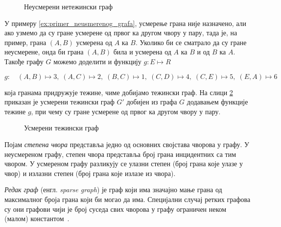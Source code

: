 \begin{figure}[ht]
\centering
\begingroup
{}
\endgroup
\caption{Неусмерени нетежински граф}
\label{fig:primer_grafa}
\end{figure}



\begin{example}
\label{ex:primer_usmerenog_grafa}
У примеру \ref{ex:primer_neusmerenog_grafa}, усмерење грана није назначено, али ако узмемо да су гране усмерене од првог ка другом чвору у пару, тада је, на пример, грана $(A,B)$ усмерена од $A$ ка $B$. Уколико би се сматрало да су гране неусмерене, онда би грана $(A,B)$ била и усмерена од $A$ ка $B$ и од $B$ ка $A$. Такође графу $G$ можемо доделити и функцију $g: E \mapsto R$

\[
g:\quad (A,B) \mapsto 3,\; (A,C) \mapsto 2,\; (B,C) \mapsto 1,\; (C,D) \mapsto 4,\; (C,E) \mapsto 5,\; (E,A) \mapsto 6
\]

\noindent која гранама придружује тежине, чиме добијамо тежински граф. На слици \ref{fig:primer_usmerenog_grafa} приказан је усмерени тежински граф $G'$ добијен из графа $G$ додавањем функције тежине $g$, при чему су гране усмерене од првог ка другом чвору у пару.
\end{example}

\begin{figure}[ht]
\centering
\begingroup
{}
\endgroup
\caption{Усмерени тежински граф}
\label{fig:primer_usmerenog_grafa}
\end{figure}

Појам \textit{степена чвора} представља једно од основних својстава чворова у графу. У неусмереном графу, степен чвора представља број грана инцидентних са тим чвором. У усмереном графу разликују се улазни степен (број грана које улазе у чвор) и излазни степен (број грана које излазе из чвора).

\textit{Редак граф} (енгл. \textit{sparse graph}) је граф који има значајно мање грана од максималног броја грана који би могао да има. Специјални случај ретких графова су они графови чији је број суседа свих чворова у графу ограничен неком (малом) константом~\cite{vandergrinten_et_al:LIPIcs.SEA.2022.11}. 


